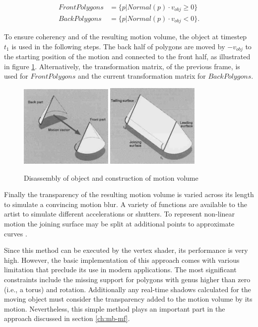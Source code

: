 \begin{align}
    FrontPolygons &= \{ p |  Normal(p) \cdot v_{obj} \geq 0 \} \\
    BackPolygons  &= \{ p |  Normal(p) \cdot v_{obj} < 0 \}.
\end{align}

To ensure coherency and of the resulting motion volume, the object at timestep $t_1$ is used in the following steps.
The back half of polygons are moved by $-v_{obj}$ to the starting position of the motion and connected to the front half, as illustrated in figure \ref{fig:object-splitting}.
Alternatively, the transformation matrix, of the previous frame, is used for $FrontPolygons$ and the current transformation matrix for $BackPolygons$.

\begin{figure}
    \centering
    \includegraphics[width=0.4\textwidth]{images/object-splitting.png}
    \includegraphics[width=0.4\textwidth]{images/object-splitting-assembly.png}
    \caption{Disassembly of object and construction of motion volume \cite{Wloka.1996}}
    \label{fig:object-splitting}
\end{figure}

Finally the transparency of the resulting motion volume is varied across its length to simulate a convincing motion blur.
A variety of functions are available to the artist to simulate different accelerations or shutters.
To represent non-linear motion the joining surface may be split at additional points to approximate curves \cite{Wloka.1996}.

Since this method can be executed by the vertex shader, its performance is very high.
However, the basic implementation of this approach comes with various limitation that preclude its use in modern applications.
The most significant constraints include the missing support for polygons with genus higher than zero (i.e., a torus) and rotation.
Additionally any real-time shadows calculated for the moving object must consider the transparency added to the motion volume by its motion.
Nevertheless, this simple method plays an important part in the approach discussed in section \ref{ch:mb-mf}.

